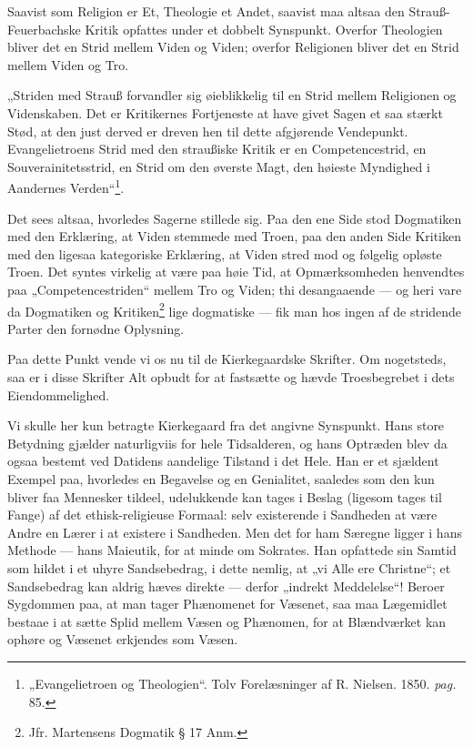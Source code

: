 \documentclass[12pt,a4paper]{book}
\newcommand{\opage}[1]{\marginnote{\footnotesize\textit{[#1]}}}
\begin{document}
Saavist som Religion er Et, Theologie et Andet, saavist maa altsaa den
Strauß-Feuerbachske Kritik opfattes under et dobbelt Synspunkt. Overfor
Theologien bliver det en Strid mellem Viden og Viden; overfor Religionen
bliver det en Strid mellem Viden og Tro.

„Striden med Strauß forvandler sig øieblikkelig til en Strid mellem
Religionen og Videnskaben. Det er Kritikernes Fortjeneste at have givet
Sagen et saa stærkt Stød, at den just derved er dreven hen til dette
afgjørende Vendepunkt. Evangelietroens Strid med den straußiske Kritik er en
Competencestrid, en Souverainitetsstrid, en Strid om den øverste Magt, den
høieste Myndighed i Aandernes Verden“\footnote{„Evangelietroen og
Theologien“. Tolv Forelæsninger af R. Nielsen. 1850. \textit{pag.} 85.}.

Det sees altsaa, hvorledes Sagerne stillede sig. Paa den ene Side stod
Dogmatiken med den Erklæring, at Viden stemmede med Troen, paa den anden
Side Kritiken med den ligesaa kategoriske Erklæring, at Viden stred mod og
følgelig opløste Troen. Det syntes virkelig at være paa høie Tid, at
\opage{19}\setcounter{footnote}{0}%
Opmærksomheden henvendtes paa „Competencestriden“ mellem Tro og Viden; thi
desangaaende --- og heri vare da Dogmatiken og Kritiken\footnote{Jfr.
Martensens Dogmatik § 17 Anm.} lige dogmatiske --- fik man hos ingen af de
stridende Parter den fornødne Oplysning.

Paa dette Punkt vende vi os nu til de Kierkegaardske Skrifter. Om
nogetsteds, saa er i disse Skrifter Alt opbudt for at fastsætte og hævde
Troesbegrebet i dets Eiendommelighed.

Vi skulle her kun betragte Kierkegaard fra det angivne Synspunkt. Hans store
Betydning gjælder naturligviis for hele Tidsalderen, og hans Optræden blev
da ogsaa bestemt ved Datidens aandelige Tilstand i det Hele. Han er et
sjældent Exempel paa, hvorledes en Begavelse og en Genialitet, saaledes som
den kun bliver faa Mennesker tildeel, udelukkende kan tages i Beslag
(ligesom tages til Fange) af det ethisk-religieuse Formaal: selv
existerende i Sandheden at være Andre en Lærer i at existere i Sandheden.
Men det for ham Særegne ligger i hans Methode --- hans Maieutik, for at
minde om Sokrates. Han opfattede sin Samtid som hildet i et uhyre
Sandsebedrag, i dette nemlig, at „vi Alle ere Christne“; et Sandsebedrag
kan aldrig hæves direkte --- derfor „indrekt Meddelelse“! Beroer
Sygdommen paa, at man tager Phænomenet for Væsenet, saa maa Lægemidlet
bestaae i at sætte Splid mellem Væsen og Phænomen, for at Blændværket kan
ophøre og Væsenet erkjendes som Væsen.
\end{document}
